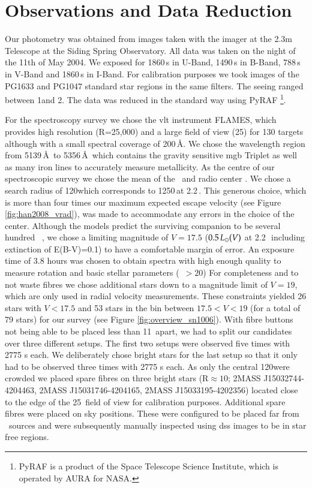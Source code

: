 \section{Observations and Data Reduction}
\label{sec:obs_red}
Our photometry was obtained from images taken with the imager at the 2.3m Telescope at the Siding Spring Observatory. All data was taken on the night of the 11th of May 2004. We exposed for 1860\,s in U-Band, 1490\,s in B-Band, 788\,s in V-Band and 1860\,s in I-Band. For calibration purposes we took images of the PG1633 and PG1047 standard star regions in the same filters. The seeing ranged between 1\arcsec and 2\arcsec. 
The data was reduced in the standard way using PyRAF \footnote{PyRAF is a product of the Space Telescope Science Institute, which is operated by AURA for NASA.}.

For the spectroscopy survey we chose the \gls{vlt} instrument FLAMES, which provides high resolution (R=25,000) and a large field of view (25\arcmin) for 130 targets although with a small spectral coverage of 200\,\AA. We chose the wavelength region from 5139\,\AA\ to 5356\,\AA\ which contains the gravity sensitive \gls{mgb} Triplet as well as many iron lines to accurately measure metallicity. As the centre of our spectroscopic survey we chose the mean of the \xray\ and radio center \citep[$\alpha = \rasc{15}{02}{22}{1};\delta = \decl{-42}{05}{49}$][]{2003ApJ...585..324W}. We chose a search radius of 120\arcsec which corresponds to 1250\,\kms at 2.2\,\kpc. This generous choice, which is more than four times our maximum expected escape velocity (see Figure \ref{fig:han2008_vrad}), was made to accommodate any errors in the choice of the center. Although the models predict the surviving companion to be several hundred \lsun\ \citep{2000ApJS..128..615M}, we chose a limiting magnitude of $V=17.5$ ($0.5\,\hbox{$L_{\odot}$}(V)$ at 2.2\,\kpc\ including extinction of E(B-V)=0.1) to have a comfortable margin of error. An exposure time of 3.8 hours was chosen to obtain spectra with high enough quality to measure rotation and basic stellar parameters (\snratio\ $>20$) For completeness and to not waste fibres we chose additional stars down to a magnitude limit of $V=19$, which are only used in radial velocity measurements. These constraints yielded 26 stars with $V<17.5$ and 53 stars in the bin between $17.5<V<19$ (for a total of 79 stars) for our survey (see Figure \ref{fig:overview_sn1006}). With fibre buttons not being able to be placed less than 11\arcsec\ apart, we had to split our candidates over three different setups. The first two setups were observed five times with 2775 s each. We deliberately chose bright stars for the last setup so that it only had to be observed three times with 2775 s each. As only the central 120\arcsec were crowded we placed spare fibres on three bright stars (R$\approx 10$; 2MASS J15032744-4204463, 2MASS J15031746-4204165, 2MASS J15033195-4202356) located close to the edge of the 25\arcmin\ field of view for calibration purposes. Additional spare fibres were placed on sky positions. These were configured to be placed far from \twomass\ sources and were subsequently manually inspected using \gls{dss} images to be in star free regions. 
